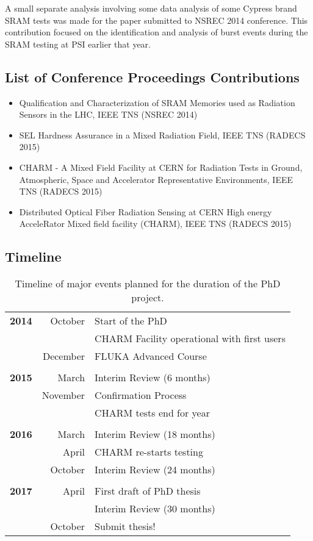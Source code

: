 A small separate analysis involving some data analysis of some Cypress brand SRAM tests was made for the paper submitted to NSREC 2014 conference. This contribution focused on the identification and analysis of burst events during the SRAM testing at PSI earlier that year. \\

\subsection*{List of Conference Proceedings Contributions}

\begin{itemize}
\item Qualification and Characterization of SRAM Memories used as Radiation Sensors in the LHC, IEEE TNS (NSREC 2014) \cite{6949151}
\item SEL Hardness Assurance in a Mixed Radiation Field, IEEE TNS (RADECS 2015) \cite{7312510}
\item CHARM - A Mixed Field Facility at CERN for Radiation Tests in Ground, Atmospheric, Space and Accelerator Representative Environments, IEEE TNS (RADECS 2015)
\item Distributed Optical Fiber Radiation Sensing at CERN High energy AcceleRator Mixed field facility (CHARM), IEEE TNS (RADECS 2015) \cite{7155495}
\end{itemize}

\subsection*{Timeline}
	
\begin{table}[htbp]
\centering
\begin{tabular}{r r l}
  \toprule
  \textbf{2014} & October & Start of the PhD \\
   & & CHARM Facility operational with first users \\
   & December & FLUKA Advanced Course \\
   & &\\
  \textbf{2015} & March & Interim Review (6 months) \\
   & November & Confirmation Process \\
   & & CHARM tests end for year \\
   & & \\  
  \textbf{2016} & March & Interim Review (18 months) \\
   & April & CHARM re-starts testing \\
   & October & Interim Review (24 months) \\
   & & \\
   \textbf{2017} & April & First draft of PhD thesis \\
   & & Interim Review (30 months) \\
   & October & Submit thesis! \\
  \bottomrule
\end{tabular}
\caption{Timeline of major events planned for the duration of the PhD project.}
\label{table:timeline}
\end{table}

